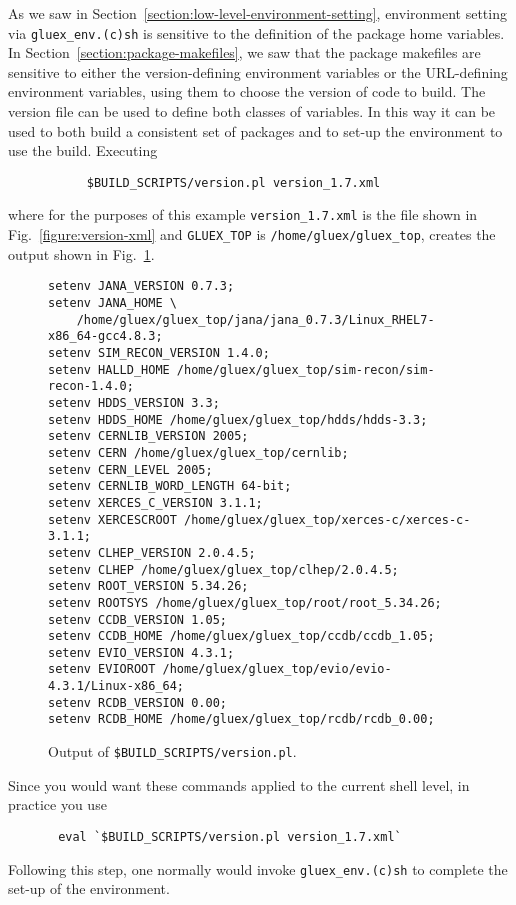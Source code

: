 \documentclass[12pt]{article}
\begin{document}
As we saw in Section~\ref{section:low-level-environment-setting},
environment setting via {\tt gluex\_env.(c)sh} is sensitive to the
definition of the package home variables. In
Section~\ref{section:package-makefiles}, we saw that the package
makefiles are sensitive to either the version-defining environment
variables or the URL-defining environment variables, using them to choose the
version of code to build. The version file can be used to define both
classes of variables. In this way it can be used to both build a
consistent set of packages and to set-up the environment to use the
build. Executing
\begin{verbatim}
           $BUILD_SCRIPTS/version.pl version_1.7.xml
\end{verbatim}
where for the purposes of this example {\tt version\_1.7.xml} is the
file shown in Fig.~\ref{figure:version-xml} and {\tt GLUEX\_TOP} is
{\tt /home/gluex/gluex\_top}, creates the output shown in
Fig.~\ref{figure:version-pl-output}.
\begin{figure}
\small
\begin{verbatim}
setenv JANA_VERSION 0.7.3;
setenv JANA_HOME \
    /home/gluex/gluex_top/jana/jana_0.7.3/Linux_RHEL7-x86_64-gcc4.8.3;
setenv SIM_RECON_VERSION 1.4.0;
setenv HALLD_HOME /home/gluex/gluex_top/sim-recon/sim-recon-1.4.0;
setenv HDDS_VERSION 3.3;
setenv HDDS_HOME /home/gluex/gluex_top/hdds/hdds-3.3;
setenv CERNLIB_VERSION 2005;
setenv CERN /home/gluex/gluex_top/cernlib;
setenv CERN_LEVEL 2005;
setenv CERNLIB_WORD_LENGTH 64-bit;
setenv XERCES_C_VERSION 3.1.1;
setenv XERCESCROOT /home/gluex/gluex_top/xerces-c/xerces-c-3.1.1;
setenv CLHEP_VERSION 2.0.4.5;
setenv CLHEP /home/gluex/gluex_top/clhep/2.0.4.5;
setenv ROOT_VERSION 5.34.26;
setenv ROOTSYS /home/gluex/gluex_top/root/root_5.34.26;
setenv CCDB_VERSION 1.05;
setenv CCDB_HOME /home/gluex/gluex_top/ccdb/ccdb_1.05;
setenv EVIO_VERSION 4.3.1;
setenv EVIOROOT /home/gluex/gluex_top/evio/evio-4.3.1/Linux-x86_64;
setenv RCDB_VERSION 0.00;
setenv RCDB_HOME /home/gluex/gluex_top/rcdb/rcdb_0.00;
\end{verbatim}
\caption{Output of {\tt \$BUILD\_SCRIPTS/version.pl}.}\label{figure:version-pl-output}
\end{figure}
Since you would want these commands applied to the current shell level, in practice you use
\begin{verbatim}
       eval `$BUILD_SCRIPTS/version.pl version_1.7.xml`
\end{verbatim}
Following this step, one normally would invoke {\tt gluex\_env.(c)sh}
to complete the set-up of the environment.
\end{document}
